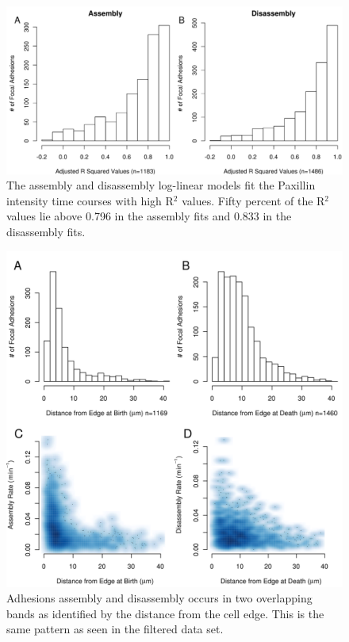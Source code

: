 \documentclass[letterpaper]{article}
\begin{document}
\begin{figure}[htbp]
\begin{center}
\includegraphics[width=\textwidth]{../figures/supplemental/R_squared}
\caption{The assembly and disassembly log-linear models fit the Paxillin
intensity time courses with high R$^2$ values. Fifty percent of the R$^2$ values
lie above 0.796 in the assembly fits and 0.833 in the disassembly fits.}
\label{default}
\end{center}
\end{figure}

\begin{figure}[htbp]
\begin{center}
\includegraphics[width=\textwidth]{../figures/supplemental/spacial_nofilt}
\caption{Adhesions assembly and disassembly occurs in two overlapping bands as
identified by the distance from the cell edge. This is the same pattern as
seen in the filtered data set.}
\label{default}
\end{center}
\end{figure}
\end{document}
